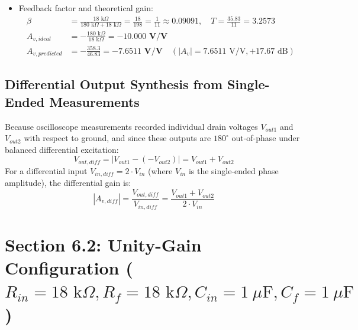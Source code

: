 \documentclass[11pt,a4paper]{article}
\begin{document}
\begin{itemize}
\begin{itemize}
\begin{align}
            f_{c,f} &= \frac{1}{2\pi R_f C_f} = \frac{1}{2\pi (180\text{ k}\Omega)(1\ \mu\text{F})} = \mathbf{0.884\text{ Hz}}
        \end{align}
        Both poles align at $0.884\text{ Hz}$, ensuring complete mid-band flatness across the audio band down to $5\text{ Hz}$.
        \item Feedback factor and theoretical gain:
        \begin{align}
            \beta &= \frac{18\text{ k}\Omega}{180\text{ k}\Omega + 18\text{ k}\Omega} = \frac{18}{198} = \frac{1}{11} \approx 0.09091, \quad T = \frac{35.83}{11} = 3.2573 \\
            A_{v,ideal} &= -\frac{180\text{ k}\Omega}{18\text{ k}\Omega} = \mathbf{-10.000\text{ V/V}} \\
            A_{v,predicted} &= -\frac{358.3}{46.83} = \mathbf{-7.6511\text{ V/V}} \quad (|A_v| = 7.6511\text{ V/V}, +17.67\text{ dB})
        \end{align}
    \end{itemize}
\end{itemize}

\subsection{Differential Output Synthesis from Single-Ended Measurements}
Because oscilloscope measurements recorded individual drain voltages $V_{out1}$ and $V_{out2}$ with respect to ground, and since these outputs are $180^\circ$ out-of-phase under balanced differential excitation:
\begin{equation}
    V_{out,diff} = |V_{out1} - (-V_{out2})| = V_{out1} + V_{out2}
\end{equation}
For a differential input $V_{in,diff} = 2 \cdot V_{in}$ (where $V_{in}$ is the single-ended phase amplitude), the differential gain is:
\begin{equation}
    |A_{v,diff}| = \frac{V_{out,diff}}{V_{in,diff}} = \frac{V_{out1} + V_{out2}}{2 \cdot V_{in}}
\end{equation}

\newpage
\section{Section 6.2: Unity-Gain Configuration ($R_{in} = 18\text{ k}\Omega, R_f = 18\text{ k}\Omega, C_{in} = 1\ \mu\text{F}, C_f = 1\ \mu\text{F}$)}
\end{document}
